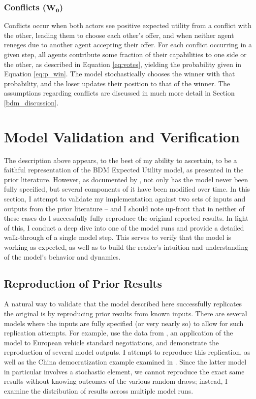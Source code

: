 \subsubsection{Conflicts ($\mathbf{W_0}$)}

Conflicts occur when both actors see positive expected utility from a conflict with the other, leading them to choose each other's offer, and when neither agent reneges due to another agent accepting their offer. For each conflict occurring in a given step, all agents contribute some fraction of their capabilities to one side or the other, as described in Equation \ref{eq:votes}, yielding the probability given in Equation \ref{eq:p_win}. The model stochastically chooses the winner with that probability, and the loser updates their position to that of the winner. The assumptions regarding conflicts are discussed in much more detail in Section \ref{bdm_discussion}.

\section{Model Validation and Verification} \label{model_vv}

The description above appears, to the best of my ability to ascertain, to be a faithful representation of the BDM Expected Utility model, as presented in the prior literature. However, as documented by \citet{scholz_2011}, not only has the model never been fully specified, but several components of it have been modified over time. In this section, I attempt to validate my implementation against two sets of inputs and outputs from the prior literature -- and I should note up-front that in neither of these cases do I successfully fully reproduce the original reported results. In light of this, I conduct a deep dive into one of the model runs and provide a detailed walk-through of a single model step. This serves to verify that the model is working as expected, as well as to build the reader's intuition and understanding of the model's behavior and dynamics.

\subsection{Reproduction of Prior Results} \label{verification}

A natural way to validate that the model described here successfully replicates the original is by reproducing prior results from known inputs. There are several models where the inputs are fully specified (or very nearly so) to allow for such replication attempts. For example, \citet{scholz_2011} use the data from \citet{bdm_1994}, an application of the model to European vehicle standard negotiations, and demonstrate the reproduction of several model outputs. I attempt to reproduce this replication, as well as the China democratization example examined in \citet[chapter 6]{bdm_2002}. Since the latter model in particular involves a stochastic element, we cannot reproduce the exact same results without knowing outcomes of the various random draws; instead, I examine the distribution of results across multiple model runs. 

